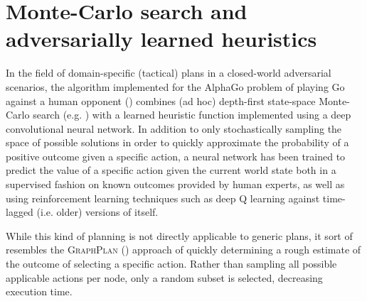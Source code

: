 \documentclass[12pt, a4paper, oneside]{article}
\begin{document}
\section{Monte-Carlo search and adversarially learned heuristics}

In the field of domain-specific (tactical) plans in a closed-world adversarial scenarios,
the algorithm implemented for the AlphaGo problem of playing Go against a human opponent (\cite{SilverHuangEtAl16nature})
combines (ad hoc) depth-first state-space Monte-Carlo search (e.g. \cite{journals/tciaig/BrownePWLCRTPSC12}) with a learned 
heuristic function implemented using a deep convolutional neural network.
In addition to only stochastically sampling the space of possible solutions in order
to quickly approximate the probability of a positive outcome given a specific action,
a neural network has been trained to predict the value of a specific action given the current world state both in a supervised fashion on known
outcomes provided by human experts, 
as well as using reinforcement learning techniques such as deep Q learning
against time-lagged (i.e. older) versions of itself.

While this kind of planning is not directly applicable to generic plans,
it sort of resembles the \textsc{GraphPlan} (\cite{Blum95fastplanning}) approach
of quickly determining a rough estimate of the outcome of selecting a specific
action.
Rather than sampling all possible applicable actions per node, only a random subset
is selected, decreasing execution time.

\printbibliography 
\end{document}
